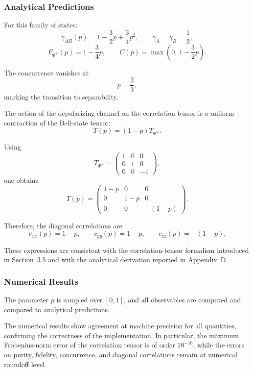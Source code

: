 \documentclass[a4paper]{article}
\begin{document}
\subsubsection{Analytical Predictions}

For this family of states:
\[
\gamma_{AB}(p)=1-\frac{3}{2}p+\frac{3}{4}p^2,
\qquad
\gamma_A=\gamma_B=\frac{1}{2},
\]
\[
F_{\Psi^+}(p)=1-\frac{3}{4}p,
\qquad
C(p)=\max\!\left(0,\,1-\frac{3}{2}p\right).
\]

The concurrence vanishes at
\[
p=\frac{2}{3},
\]
marking the transition to separability.

The action of the depolarizing channel on the correlation tensor is a uniform contraction of the Bell-state tensor:
\[
T(p) = (1-p)T_{\Psi^+}.
\]

Using
\[
T_{\Psi^+}
=
\begin{pmatrix}
1 & 0 & 0 \\
0 & 1 & 0 \\
0 & 0 & -1
\end{pmatrix},
\]
one obtains
\[
T(p)
=
\begin{pmatrix}
1-p & 0 & 0 \\
0 & 1-p & 0 \\
0 & 0 & -(1-p)
\end{pmatrix}.
\]

Therefore, the diagonal correlations are
\[
c_{xx}(p)=1-p,\qquad
c_{yy}(p)=1-p,\qquad
c_{zz}(p)=-(1-p).
\]

These expressions are consistent with the correlation-tensor formalism introduced in Section~3.5 and with the analytical derivation reported in Appendix~D.


\subsubsection{Numerical Results}

The parameter \(p\) is sampled over \([0,1]\), and all observables are computed and compared to analytical predictions.

The numerical results show agreement at machine precision for all quantities, confirming the correctness of the implementation. In particular, the maximum Frobenius-norm error of the correlation tensor is of order \(10^{-16}\), while the errors on purity, fidelity, concurrence, and diagonal correlations remain at numerical roundoff level.
\end{document}
